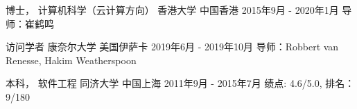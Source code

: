 

\begin{cventries}


\cventry
{博士， 计算机科学（云计算方向）} %
{香港大学} %
{中国香港} %
{2015年9月 - 2020年1月} %
{ %
导师：崔鹤鸣
}


\cventry
{访问学者} %
{康奈尔大学} %
{美国伊萨卡} %
{2019年6月 - 2019年10月} %
{ %
导师：Robbert van Renesse, Hakim Weatherspoon
}


\cventry
{本科， 软件工程} %
{同济大学} %
{中国上海} %
{2011年9月 - 2015年7月} %
{ %
绩点: 4.6/5.0, 排名：9/180
}

\end{cventries}